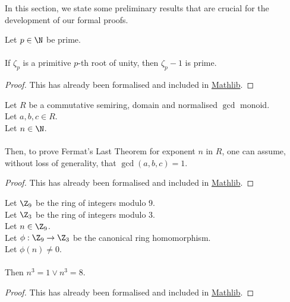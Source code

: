 In this section, we state some preliminary results that are crucial for the development of our formal proofs.

\begin{theorem}
    \label{thm:zeta_sub_one_prime1}
    \leanok
    Let $p \in \N$ be prime. \\\\
    If $\zeta_p$ is a primitive $p$-th root of unity, then $\zeta_p - 1$ is prime.
\end{theorem}
\begin{proof}
    \leanok
    This has already been formalised and included in \href{https://pitmonticone.github.io/FLT3/docs/FLT3/Mathlib/NumberTheory/Cyclotomic/Rat.html#IsPrimitiveRoot.zeta_sub_one_prime'}{Mathlib}.
\end{proof}

\begin{lemma}
    \label{lmm:fermatLastTheoremWith_of_fermatLastTheoremWith_coprime}
    \leanok
    Let $R$ be a commutative semiring, domain and normalised $\gcd$ monoid.\\%
    Let $a, b, c \in R$. \\
    Let $n \in \N$. \\\\
    Then, to prove Fermat's Last Theorem for exponent $n$ in $R$,
    one can assume, without loss of generality, that $\gcd(a,b,c)=1$.
  \end{lemma}
  \begin{proof}
    \leanok
    This has already been formalised and included in \href{https://pitmonticone.github.io/FLT3/docs/FLT3/Mathlib/NumberTheory/FLT/Basic.html#fermatLastTheoremWith_of_fermatLastTheoremWith_coprime}{Mathlib}.
  \end{proof}

  \begin{lemma}
    \label{lmm:cube_of_castHom_ne_zero}
    \leanok
    Let $\Z_9$ be the ring of integers modulo $9$. \\
    Let $\Z_3$ be the ring of integers modulo $3$. \\
    Let $n \in \Z_9$. \\
    Let $\phi : \Z_9 \to \Z_3$ be the canonical ring homomorphism. \\
    Let $\phi(n) \neq 0$. \\ \\
    Then $n^3=1 \lor n^3=8$.
  \end{lemma}
  \begin{proof}
    \leanok
    This has already been formalised and included in \href{https://pitmonticone.github.io/FLT3/docs/FLT3/Mathlib/NumberTheory/FLT/Three.html#cube_of_castHom_ne_zero}{Mathlib}.
  \end{proof}